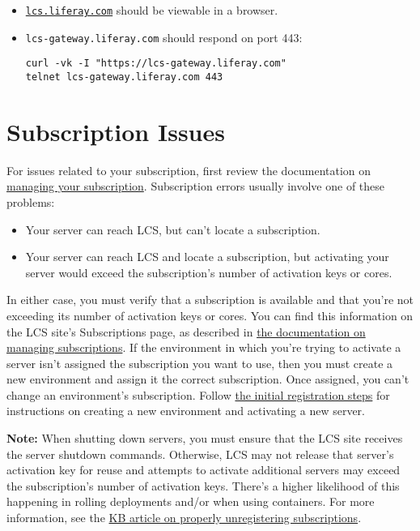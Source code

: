\begin{itemize}
\item
  \href{https://lcs.liferay.com/}{\texttt{lcs.liferay.com}} should be
  viewable in a browser.
\item
  \texttt{lcs-gateway.liferay.com} should respond on port 443:

\begin{verbatim}
curl -vk -I "https://lcs-gateway.liferay.com"
telnet lcs-gateway.liferay.com 443
\end{verbatim}
\end{itemize}

\section{Subscription Issues}\label{subscription-issues}

For issues related to your subscription, first review the documentation
on
\href{/docs/7-2/deploy/-/knowledge_base/d/managing-liferay-dxp-subscriptions}{managing
your subscription}. Subscription errors usually involve one of these
problems:

\begin{itemize}
\tightlist
\item
  Your server can reach LCS, but can't locate a subscription.
\item
  Your server can reach LCS and locate a subscription, but activating
  your server would exceed the subscription's number of activation keys
  or cores.
\end{itemize}

In either case, you must verify that a subscription is available and
that you're not exceeding its number of activation keys or cores. You
can find this information on the LCS site's Subscriptions page, as
described in
\href{/docs/7-2/deploy/-/knowledge_base/d/managing-liferay-dxp-subscriptions}{the
documentation on managing subscriptions}. If the environment in which
you're trying to activate a server isn't assigned the subscription you
want to use, then you must create a new environment and assign it the
correct subscription. Once assigned, you can't change an environment's
subscription. Follow
\href{/docs/7-2/deploy/-/knowledge_base/d/activating-your-liferay-dxp-server-with-lcs}{the
initial registration steps} for instructions on creating a new
environment and activating a new server.

\noindent\hrulefill

\textbf{Note:} When shutting down servers, you must ensure that the LCS
site receives the server shutdown commands. Otherwise, LCS may not
release that server's activation key for reuse and attempts to activate
additional servers may exceed the subscription's number of activation
keys. There's a higher likelihood of this happening in rolling
deployments and/or when using containers. For more information, see the
\href{https://help.liferay.com/hc/en-us/articles/360018261011}{KB
article on properly unregistering subscriptions}.

